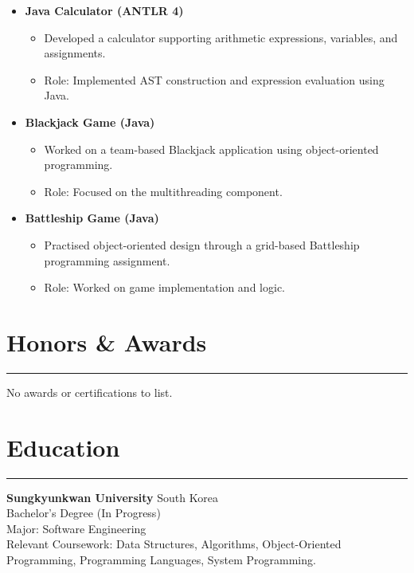 \documentclass[letterpaper,10pt]{article}
\begin{document}
\begin{itemize}

    \item \textbf{Java Calculator (ANTLR 4)}
    \begin{itemize}
        \item Developed a calculator supporting arithmetic expressions, variables, and assignments.
        \item Role: Implemented AST construction and expression evaluation using Java.
    \end{itemize}

    \item \textbf{Blackjack Game (Java)}
    \begin{itemize}
        \item Worked on a team-based Blackjack application using object-oriented programming.
        \item Role: Focused on the multithreading component.
    \end{itemize}

    \item \textbf{Battleship Game (Java)}
    \begin{itemize}
        \item Practised object-oriented design through a grid-based Battleship programming assignment.
        \item Role: Worked on game implementation and logic.
    \end{itemize}

\end{itemize}


\section*{Honors \& Awards}
\hrule
\vspace{4pt}

No awards or certifications to list.


\section*{Education}
\hrule
\vspace{4pt}

\textbf{Sungkyunkwan University} \hfill South Korea \\
Bachelor's Degree (In Progress) \\
Major: Software Engineering \\
Relevant Coursework: Data Structures, Algorithms,
Object-Oriented Programming, Programming Languages,
System Programming.
\end{document}
